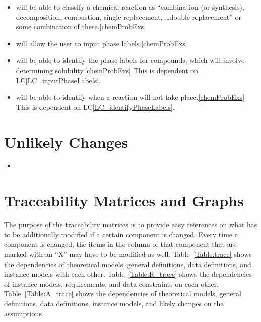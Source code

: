 \documentclass[12pt]{article}
\newcommand{\aref}[1]{A\ref{#1}}
\newcounter{lcnum} %
\newcommand{\lcref}[1]{LC\ref{#1}}
\begin{document}
\begin{itemize}
	
\item[LC\refstepcounter{lcnum}\thelcnum\label{LC_classRxns}:] \progname{} will be
	able to classify a chemical reaction as ``combination (or
	synthesis), decomposition, combustion, single replacement, \dots double
	replacement'' \cite[p.~301]{lund_introduction_2023} or some combination of
	these.\cref{chemProbExs}
	
\item[LC\refstepcounter{lcnum}\thelcnum\label{LC_inputPhaseLabels}:] \progname{}
	will allow the user to input phase labels.\cref{chemProbExs}
	
\item[LC\refstepcounter{lcnum}\thelcnum\label{LC_identifyPhaseLabels}:]
	\progname{} will be able to identify the phase labels for compounds, which will
	involve determining solubility.\cref{chemProbExs} This is dependent on
	\lcref{LC_inputPhaseLabels}.
	
\item[LC\refstepcounter{lcnum}\thelcnum\label{LC_rxnTakePlace}:] \progname{}
	will be able to identify when a reaction will not take place.\cref{chemProbExs}
	This is dependent on \lcref{LC_identifyPhaseLabels}.

\end{itemize}

\section{Unlikely Changes}    

\noindent \begin{itemize}

\item[LC\refstepcounter{lcnum}\thelcnum\label{LC_meaningfulLabel}:]  

\end{itemize}

\section{Traceability Matrices and Graphs}

The purpose of the traceability matrices is to provide easy references on what
has to be additionally modified if a certain component is changed.  Every time a
component is changed, the items in the column of that component that are marked
with an ``X'' may have to be modified as well.  Table~\ref{Table:trace} shows the
dependencies of theoretical models, general definitions, data definitions, and
instance models with each other. Table~\ref{Table:R_trace} shows the
dependencies of instance models, requirements, and data constraints on each
other. Table~\ref{Table:A_trace} shows the dependencies of theoretical models,
general definitions, data definitions, instance models, and likely changes on
the assumptions.
\end{document}
